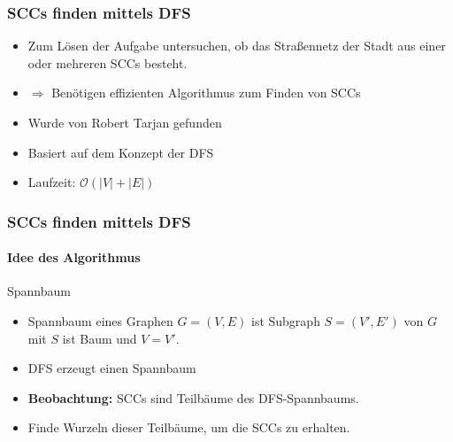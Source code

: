 \begin{frame}
	\frametitle{SCCs finden mittels DFS}
	\begin{itemize}
		\item Zum Lösen der Aufgabe untersuchen, ob das Straßennetz der Stadt aus einer oder mehreren SCCs besteht.
		\item $\Rightarrow$ Benötigen effizienten Algorithmus zum Finden von SCCs 
	\end{itemize}	
	\pause
	\begin{itemize}
		\item Wurde von Robert Tarjan gefunden
		\item Basiert auf dem Konzept der DFS
		\item Laufzeit: $\mathcal{O}(|V| + |E|)$
	\end{itemize}
\end{frame}
\begin{frame}
	\frametitle{SCCs finden mittels DFS}
	\framesubtitle{Idee des Algorithmus}
	\begin{KITinfoblock}{Spannbaum}
		\begin{itemize}
			\item Spannbaum eines Graphen $G=(V,E)$ ist Subgraph $S=(V',E')$ von $G$ mit $S$ ist Baum und $V = V'$.
		\end{itemize}
	\end{KITinfoblock}
	\begin{itemize}
		
		\item DFS erzeugt einen Spannbaum
		\pause
		\item \textbf{Beobachtung:} SCCs sind Teilbäume des DFS-Spannbaums.
		\item Finde Wurzeln dieser Teilbäume, um die SCCs zu erhalten.
	\end{itemize}
\end{frame}
